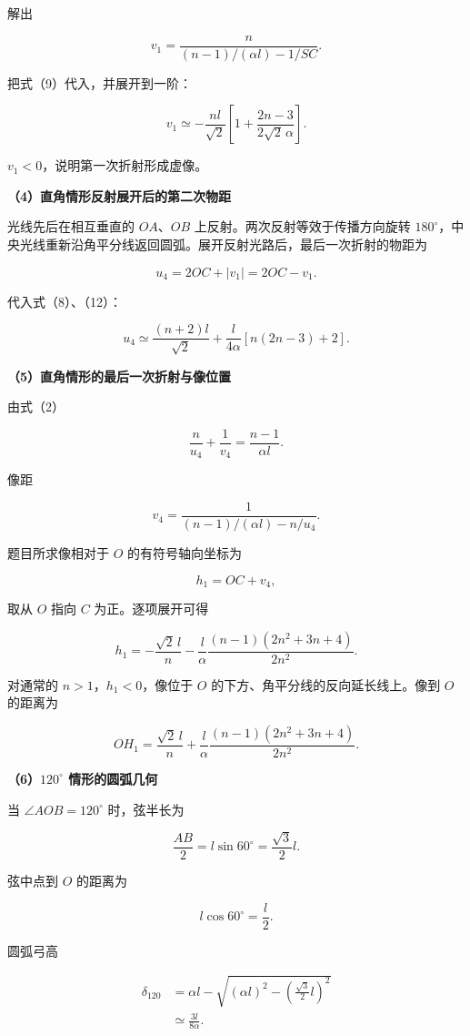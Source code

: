 \documentclass[12pt,a4paper,UTF8]{ctexart}
\begin{document}
解出

\[
v_1
=\frac n{(n-1)/(\alpha l)-1/SC}.
\tag{11}
\]

把式（9）代入，并展开到一阶：

\[
\boxed{
v_1
\simeq
-\frac{nl}{\sqrt2}
\left[
1+\frac{2n-3}{2\sqrt2\,\alpha}
\right]
}.
\tag{12}
\]

\(v_1<0\)，说明第一次折射形成虚像。

\textbf{（4）直角情形反射展开后的第二次物距}

光线先后在相互垂直的 \(OA\)、\(OB\) 上反射。两次反射等效于传播方向旋转
\(180^\circ\)，中央光线重新沿角平分线返回圆弧。展开反射光路后，最后一次折射的物距为

\[
u_4=2OC+|v_1|=2OC-v_1.
\tag{13}
\]

代入式（8）、（12）：

\[
\boxed{
u_4
\simeq
\frac{(n+2)l}{\sqrt2}
+\frac l{4\alpha}
\left[n(2n-3)+2\right]
}.
\tag{14}
\]

\textbf{（5）直角情形的最后一次折射与像位置}

由式（2）

\[
\frac n{u_4}+\frac1{v_4}
=\frac{n-1}{\alpha l}.
\tag{15}
\]

像距

\[
v_4
=\frac1{(n-1)/(\alpha l)-n/u_4}.
\tag{16}
\]

题目所求像相对于 \(O\) 的有符号轴向坐标为

\[
h_1=OC+v_4,
\tag{17}
\]

取从 \(O\) 指向 \(C\) 为正。逐项展开可得

\[
\boxed{
h_1
=-\frac{\sqrt2\,l}{n}
-\frac l\alpha
\frac{(n-1)(2n^2+3n+4)}{2n^2}
}.
\tag{18}
\]

对通常的 \(n>1\)，\(h_1<0\)，像位于 \(O\)
的下方、角平分线的反向延长线上。像到 \(O\) 的距离为

\[
\boxed{
OH_1
=\frac{\sqrt2\,l}{n}
+\frac l\alpha
\frac{(n-1)(2n^2+3n+4)}{2n^2}
}.
\tag{19}
\]

\textbf{（6）\(120^\circ\) 情形的圆弧几何}

当 \(\angle AOB=120^\circ\) 时，弦半长为

\[
\frac{AB}{2}=l\sin60^\circ=\frac{\sqrt3}{2}l.
\]

弦中点到 \(O\) 的距离为

\[
l\cos60^\circ=\frac l2.
\]

圆弧弓高

\[
\begin{aligned}
\delta_{120}
&=\alpha l
-\sqrt{(\alpha l)^2-\left(\frac{\sqrt3}{2}l\right)^2}\\
&\simeq\frac{3l}{8\alpha}.
\end{aligned}
\tag{20}
\]
\end{document}
